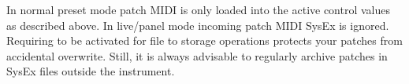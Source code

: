 In normal preset mode patch MIDI is only loaded into the active control values as described above. In live/panel mode incoming patch MIDI SysEx is ignored. Requiring \patchmgmt to be activated for file to storage operations protects your patches from accidental overwrite. Still, it is always advisable to regularly archive patches in SysEx files outside the instrument.
